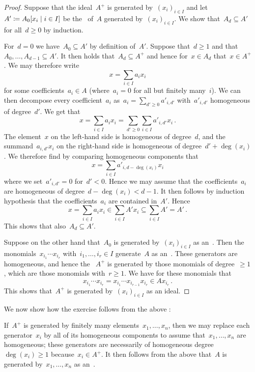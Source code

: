 \begin{proof}
  Suppose that the ideal~$A^+$ is generated by~$(x_i)_{i \in I}$ and let~$A' \defined A_0[x_i \suchthat i \in I]$ be the~ of~$A$ generated by~$(x_i)_{i \in I}$.
  We show that~$A_d \subseteq A'$ for all~$d \geq 0$ by induction.
  
  For~$d = 0$ we have~$A_0 \subseteq A'$ by definition of~$A'$.
  Suppose that~$d \geq 1$ and that~$A_0, \dotsc, A_{d-1} \subseteq A'$.
  It then holds that~$A_d \subseteq A^+$ and hence for~$x \in A_d$ that~$x \in A^+$.
  We may therefore write
  \[
      x
    = \sum_{i \in I} a_i x_i
  \]
  for some coefficients~$a_i \in A$ (where~$a_i = 0$ for all but finitely many~$i$).
  We can then decompose every coefficient~$a_i$ as~$a_i = \sum_{d' \geq 0} a'_{i,d'}$ with~$a'_{i,d'}$ homogeneous of degree~$d'$.
  We get that
  \[
      x
    = \sum_{i \in I} a_i x_i
    = \sum_{d' \geq 0} \sum_{i \in I} a'_{i,d'} x_i \,.
  \]
  The element~$x$ on the left-hand side is homogeneous of degree~$d$, and the summand~$a_{i,d'} x_i$ on the right-hand side is homogeneous of degree~$d' + \deg(x_i)$.
  We therefore find by comparing homogeneous components that
  \[
      x
    = \sum_{i \in I} a'_{i, d-\deg(x_i)} x_i
  \]
  where we set~$a'_{i,d'} = 0$ for~$d' < 0$.
  Hence we may assume that the coefficients~$a_i$ are homogeneous of degree~$d - \deg(x_i) < d - 1$.
  It then follows by induction hypothesis that the coefficients~$a_i$ are contained in~$A'$.
  Hence
  \[
              x
    =         \sum_{i \in I} a_i x_i
    \in       \sum_{i \in I} A' x_i
    \subseteq \sum_{i \in I} A'
    =         A' \,.
  \]
  This shows that also~$A_d \subseteq A'$.
  
  Suppose on the other hand that~$A_0$ is generated by~$(x_i)_{i \in I}$ as an~.
  Then the monomials~$x_{i_1} \dotsm x_{i_r}$ with~$i_1, \dotsc, i_r \in I$ generate~$A$ as an~{}.
  These generators are homogeneous, and hence the ~$A^+$ is generated by those monomials of degree~$\geq 1$, which are those monomials with~$r \geq 1$.
  We have for these monomials that
  \[
        x_{i_1} \dotsm x_{i_r}
    =   x_{i_1} \dotsm x_{i_{r-1}} x_{i_r}
    \in A x_{i_r} \,.
  \]
  This shows that~$A^+$ is generated by~$(x_i)_{i \in I}$ as an ideal.
\end{proof}

We now show how the exercise follows from the above :

If~$A^+$ is generated by finitely many elements~$x_1, \dotsc, x_n$, then we may replace each generator~$x_i$ by all of its homogeneous components to assume that~$x_1, \dotsc, x_n$ are homogeneous;
these generators are necessarily of homogeneous degree~$\deg(x_i) \geq 1$ because~$x_i \in A^+$.
It then follows from the above  that~$A$ is generated by~$x_1, \dotsc, x_n$ as an~.

